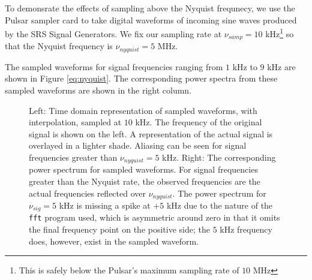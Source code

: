 \documentclass[12pt]{article}
\begin{document}
To demonsrate the effects of sampling above the Nyquist frequnecy, we use the Pulsar sampler card to take digital waveforms of incoming sine waves produced by the SRS Signal Generators. We fix our sampling rate at $\nu_{samp} = 10$ kHz\footnote{This is safely below the Pulsar's maximum sampling rate of $10$ MHz} so that the Nyquist frequency is $\nu_{nyquist} = 5$ MHz.

The sampled waveforms for signal frequencies ranging from $1$ kHz to $9$ kHz are shown in Figure \ref{eq:nyquist}. The corresponding power spectra from these sampled waveforms are shown in the right column.

\begin{figure}[H]
\caption[SODUMB]{Left: Time domain representation of sampled waveforms, with interpolation, sampled at $10$ kHz. The frequency of the original signal is shown on the left. A representation of the actual signal is overlayed in a lighter shade. Aliasing can be seen for signal frequencies greater than $\nu_{nyquist}=5$ kHz. Right: The corresponding power spectrum for sampled waveforms. For signal frequencies greater than the Nyquist rate, the observed frequencies are the actual frequencies reflected over $\nu_{nyquist}$. The power spectrum for $\nu_{sig}=5$ kHz is missing a spike at $+5$ kHz due to the nature of the \texttt{fft} program used, which is asymmetric around zero in that it omits the final frequency point on the positive side; the $5$ kHz frequency does, however, exist in the sampled waveform.}
\label{fig:nyquist}
\end{figure}
\end{document}
